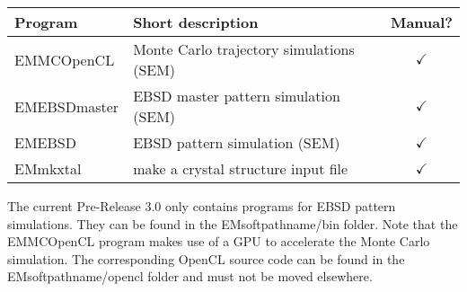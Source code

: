 \documentclass[DIV=calc, paper=letter, fontsize=11pt]{scrartcl}	 %
\begin{document}
\begin{table*}[h]
\centering\leavevmode
\begin{tabular}{|l|l|c|}
\hline
Program & Short description & Manual? \\
\hline\hline
  \textsf{EMMCOpenCL} & Monte Carlo trajectory simulations (SEM) & $\checkmark$\\
  \textsf{EMEBSDmaster} & EBSD master pattern simulation (SEM) & $\checkmark$\\
  \textsf{EMEBSD} & EBSD pattern simulation (SEM) & $\checkmark$\\
\hline
  \textsf{EMmkxtal} & make a crystal structure input file& $\checkmark$\\
\hline
\end{tabular}
\end{table*}

The current Pre-Release 3.0 only contains programs for EBSD pattern simulations.  They can be found in the 
EMsoftpathname/bin folder.  Note that the EMMCOpenCL program makes use of a GPU to accelerate the 
Monte Carlo simulation.  The corresponding OpenCL source code can be found in the EMsoftpathname/opencl
folder and must not be moved elsewhere.  
\end{document}
